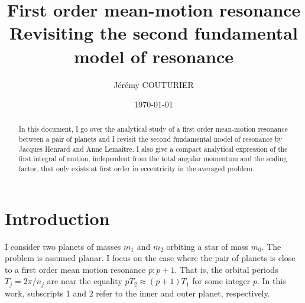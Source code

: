 \documentclass[12pt,a4paper,oneside]{article}
\title{First order mean-motion resonance \\[1ex] \large Revisiting the second fundamental model of resonance}
\author{J\'er\'emy COUTURIER}
\date{\today}
\begin{document}
\maketitle

\tableofcontents


\begin{abstract}
	In this document, I go over the analytical study of a first order mean-motion resonance between a pair of planets and I revisit the second fundamental model of resonance by Jacques Henrard and Anne Lemaître. I also give a compact analytical expression of the first integral of motion, independent from the total angular momentum and the scaling factor, that only exists at first order in eccentricity in the averaged problem.
\end{abstract}

\section{Introduction}
I consider two planets of masses $m_1$ and $m_2$ orbiting a star of mass $m_0$. The problem is assumed planar. I focus on the case where the pair of planets is close to a first order mean motion resonance $p:p+1$. That is, the orbital periods $T_j=2\pi/n_j$ are near the equality $pT_2\approx\left(p+1\right)T_1$ for some integer $p$. In this work, subscripts $1$ and $2$ refer to the inner and outer planet, respectively.
\end{document}
